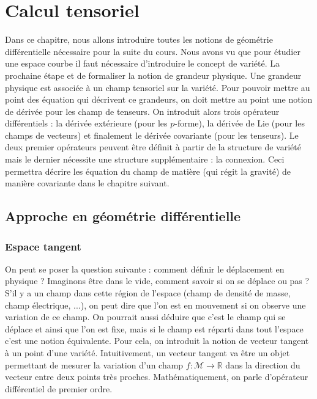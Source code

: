 \documentclass[a4paper,11pt]{report}
\theoremstyle{definition}
\theoremstyle{plain}
\theoremstyle{definition}
\theoremstyle{remark}
\newcommand{\M}{\mathscr{M}}
\begin{document}
\chapter{Calcul tensoriel}

    Dans ce chapitre, nous allons introduire toutes les notions de géométrie différentielle nécessaire pour la suite du cours. Nous avons vu que pour étudier une espace courbe il faut nécessaire d'introduire le concept de variété. La prochaine étape et de formaliser la notion de grandeur physique. Une grandeur physique est associée à un champ tensoriel sur la variété. Pour pouvoir mettre au point des équation qui décrivent ce grandeurs, on doit mettre au point une notion de dérivée pour les champ de tenseurs. On introduit alors trois opérateur différentiels : la dérivée extérieure (pour les $p$-forme), la dérivée de Lie (pour les champs de vecteurs) et finalement le dérivée covariante (pour les tenseurs). Le deux premier opérateurs peuvent être définit à partir de la structure de variété mais le dernier nécessite une structure supplémentaire : la connexion. Ceci permettra décrire les équation du champ de matière (qui régit la gravité) de manière covariante dans le chapitre suivant.
    
        \section{Approche en géométrie différentielle}
        
            \subsection{Espace tangent}
                
                On peut se poser la question suivante : comment définir le déplacement en physique ? Imaginons être dans le vide, comment savoir si on se déplace ou pas ? S'il y a un champ dans cette région de l'espace (champ de densité de masse, champ électrique, ...), on peut dire que l'on est en mouvement si on observe une variation de ce champ. On pourrait aussi déduire que c'est le champ qui se déplace et ainsi que l'on est fixe, mais si le champ est réparti dans tout l'espace c'est une notion équivalente. Pour cela, on introduit la notion de vecteur tangent à un point d'une variété. Intuitivement, un vecteur tangent va être un objet permettant de mesurer la variation d'un champ $f:\M\to\mathbb{R}$ dans la direction du vecteur entre deux points très proches. Mathématiquement, on parle d'opérateur différentiel de premier ordre.\\
                
\end{document}
